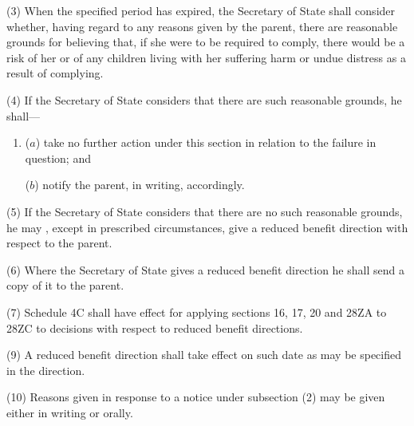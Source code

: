 \documentclass[12pt,a4paper]{article}
\begin{document}
(3) When the specified period has expired, 
the Secretary of State  %
shall consider whether, having regard to any reasons given by the parent, there are reasonable grounds for believing that, if she were to be required to comply, there would be a risk of her or of any children living with her suffering harm or undue distress as a result of complying.

(4) If 
the Secretary of State  %
considers that there are such reasonable grounds, he shall—
\begin{enumerate}\item[]
($a$) take no further action under this section in relation to the failure in question; and

($b$) notify the parent, in writing, accordingly.
\end{enumerate}

(5) If 
the Secretary of State  %
considers that there are no such reasonable grounds, he may%
, except in prescribed circumstances,  %
give a reduced benefit direction with respect to the parent.

(6) Where 
the Secretary of State  %
gives a reduced benefit direction he shall send a copy of it to the parent.

%

(7) Schedule 4C shall have effect for applying sections 16, 17, 20 and 28ZA to 28ZC to decisions with respect to reduced benefit directions.

(9) A reduced benefit direction shall take effect on such date as may be specified in the direction.

(10) Reasons given in response to a notice under subsection (2)  may be given either in writing or orally.
\end{document}
